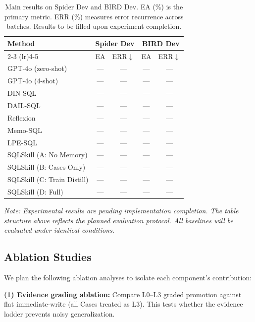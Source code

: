 \begin{table}[h]
  \centering
  \small
  \caption{Main results on Spider Dev and BIRD Dev. EA (\%) is the primary metric. ERR (\%) measures error recurrence across batches. Results to be filled upon experiment completion.}
  \label{tab:main_results}
  \begin{tabular}{lcccc}
    \toprule
    \multirow{2}{*}{Method} & \multicolumn{2}{c}{Spider Dev} & \multicolumn{2}{c}{BIRD Dev} \\
    \cmidrule(lr){2-3} \cmidrule(lr){4-5}
    & EA & ERR$\downarrow$ & EA & ERR$\downarrow$ \\
    \midrule
    GPT-4o (zero-shot) & --- & --- & --- & --- \\
    GPT-4o (4-shot) & --- & --- & --- & --- \\
    DIN-SQL & --- & --- & --- & --- \\
    DAIL-SQL & --- & --- & --- & --- \\
    Reflexion & --- & --- & --- & --- \\
    Memo-SQL & --- & --- & --- & --- \\
    LPE-SQL & --- & --- & --- & --- \\
    \midrule
    SQLSkill (A: No Memory) & --- & --- & --- & --- \\
    SQLSkill (B: Cases Only) & --- & --- & --- & --- \\
    SQLSkill (C: Train Distill) & --- & --- & --- & --- \\
    SQLSkill (D: Full) & --- & --- & --- & --- \\
    \bottomrule
  \end{tabular}
\end{table}

\textit{Note: Experimental results are pending implementation completion. The table structure above reflects the planned evaluation protocol. All baselines will be evaluated under identical conditions.}

\subsection{Ablation Studies}
\label{subsec:ablation}

We plan the following ablation analyses to isolate each component's contribution:

\textbf{(1) Evidence grading ablation:} Compare L0--L3 graded promotion against flat immediate-write (all Cases treated as L3). This tests whether the evidence ladder prevents noisy generalization.

